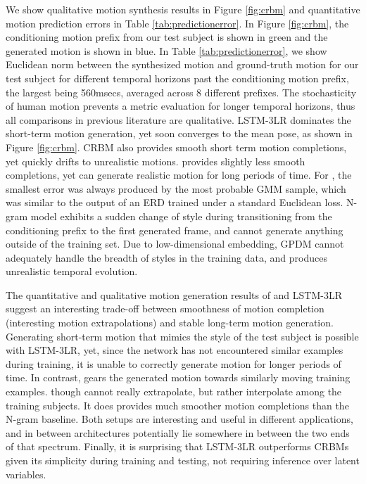 \documentclass[10pt,twocolumn,letterpaper]{article}
\begin{document}
We show  qualitative motion synthesis results in Figure \ref{fig:crbm}  and  quantitative motion prediction errors in Table \ref{tab:predictionerror}.  In Figure \ref{fig:crbm},  the conditioning motion prefix from our test subject is shown in green  and the generated motion is shown in blue. 
In Table \ref{tab:predictionerror}, we show Euclidean norm between the synthesized motion  and ground-truth   motion for our test subject  for different temporal horizons past the conditioning motion prefix, the largest being 560msecs, averaged across 8 different prefixes. The stochasticity of human motion prevents a metric evaluation for longer temporal horizons, thus all comparisons in previous literature are qualitative.  
LSTM-3LR dominates the short-term motion generation, yet soon converges to the mean pose, as shown in Figure \ref{fig:crbm}. CRBM also provides smooth short term motion completions,  yet quickly drifts to unrealistic motions.  provides slightly less smooth completions, yet can generate realistic  motion for long periods of time. For , the smallest error was always produced by the most probable GMM sample, which was similar to the output of an ERD trained under a standard Euclidean loss. N-gram model exhibits a sudden change of style during transitioning from the conditioning prefix to the first generated frame, and cannot generate anything outside of the training set. Due to low-dimensional embedding, GPDM cannot adequately handle the breadth of styles in the training data, and produces unrealistic temporal evolution.  


The quantitative and qualitative motion generation results of  and LSTM-3LR suggest an interesting trade-off between smoothness of motion completion (interesting motion extrapolations) and stable long-term motion generation. Generating short-term motion that mimics the style of the test subject is possible with LSTM-3LR, yet, since the network has not encountered similar  examples during  training, it is unable to correctly generate motion for longer periods of time. In contrast,  gears the  generated motion towards similarly moving training examples.   though cannot really extrapolate, but rather interpolate among the training subjects. It does   provides much smoother motion completions than the N-gram baseline. Both setups are interesting and useful in different applications, and in between architectures potentially lie somewhere in between the two ends of that spectrum. Finally, it is surprising that LSTM-3LR outperforms CRBMs given its simplicity during  training and testing, not requiring inference over latent variables. 
\end{document}
